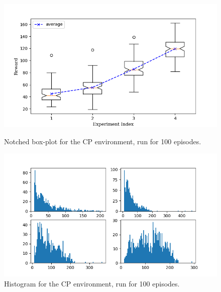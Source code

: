 \documentclass[hidelinks,journal]{IEEEtran}
\begin{document}
\begin{appendices}
\begin{figure}[!h]
  \centering
  \includegraphics[scale=1]{graph/cp1ResBox.png}
  \caption{Notched box-plot for the CP environment, run for 100 episodes.}
  \includegraphics[scale=1]{graph/cp1ResHist.png}
  \caption{Histogram for the CP environment, run for 100 episodes.}
\end{figure}

\pagebreak


\end{appendices}
\end{document}
